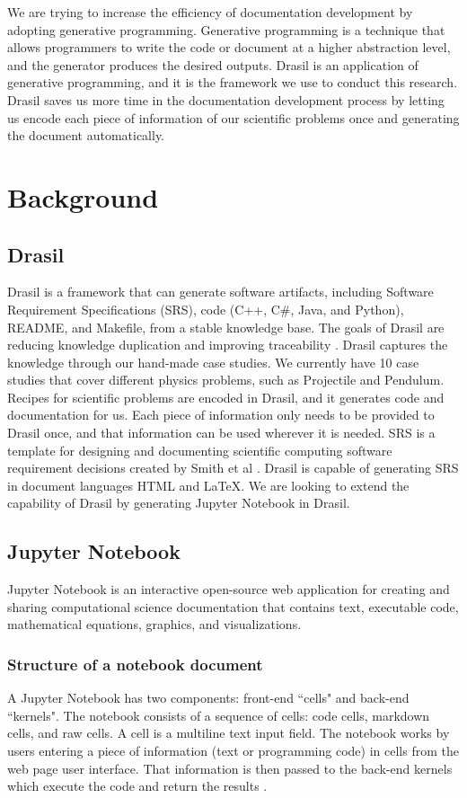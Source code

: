 We are trying to increase the efficiency of documentation development by 
adopting generative programming. Generative programming is a technique that 
allows programmers to write the code or document at a higher abstraction level, 
and the generator produces the desired outputs. Drasil is an application of 
generative programming, and it is the framework we use to conduct this 
research. Drasil saves us more time in the documentation development process by 
letting us encode each piece of information of our scientific problems once and 
generating the document automatically.


\section{Background}
\subsection{Drasil}
Drasil is a framework that can generate software artifacts, including Software 
Requirement Specifications (SRS), code (C++, C\#, Java, and Python), README, 
and Makefile, from a stable knowledge base. The goals of Drasil are reducing 
knowledge duplication and improving traceability \cite{drasil}. Drasil captures 
the knowledge through our hand-made case studies. We currently have 10 case 
studies that cover different physics problems, such as Projectile and Pendulum. 
Recipes for scientific problems are encoded in Drasil, and it generates code 
and documentation for us. Each piece of information only needs to be provided 
to Drasil once, and that information can be used wherever it is needed. 
 SRS is a template for designing and documenting 
scientific computing software requirement decisions created by Smith et al 
\cite{smith2005new}. Drasil is capable of generating SRS in document languages 
HTML and LaTeX. We are looking to extend the capability of Drasil by generating 
Jupyter Notebook in Drasil.

\subsection{Jupyter Notebook}
Jupyter Notebook is an interactive open-source web application for creating and 
sharing computational science documentation that contains text, executable 
code, mathematical equations, graphics, and visualizations.

\subsubsection{Structure of a notebook document}
A Jupyter Notebook has two components: front-end ``cells" and back-end 
``kernels". The notebook consists of a sequence of cells: code cells, markdown 
cells, and raw cells. A cell is a multiline text input field. The notebook 
works by users entering a piece of information (text or programming code) in 
cells from the web page user interface. That information is then passed to the 
back-end kernels which execute the code and return the results 
\cite{notebookdoc}.

